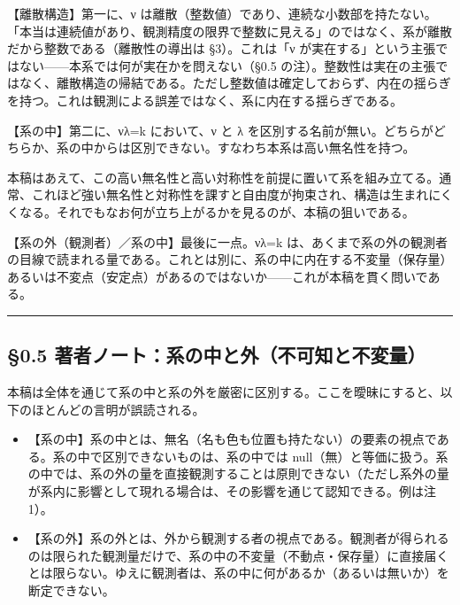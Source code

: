 \documentclass[11pt]{ltjsarticle}
\providecommand{\tightlist}{\setlength{\itemsep}{0pt}\setlength{\parskip}{0pt}}
\begin{document}
【離散構造】第一に、ν
は離散（整数値）であり、連続な小数部を持たない。「本当は連続値があり、観測精度の限界で整数に見える」のではなく、系が離散だから整数である（離散性の導出は
§3）。これは「ν
が実在する」という主張ではない------本系では何が実在かを問えない（§0.5
の注）。整数性は実在の主張ではなく、離散構造の帰結である。ただし整数値は確定しておらず、内在の揺らぎを持つ。これは観測による誤差ではなく、系に内在する揺らぎである。

【系の中】第二に、νλ=k において、ν と λ
を区別する名前が無い。どちらがどちらか、系の中からは区別できない。すなわち本系は高い無名性を持つ。

本稿はあえて、この高い無名性と高い対称性を前提に置いて系を組み立てる。通常、これほど強い無名性と対称性を課すと自由度が拘束され、構造は生まれにくくなる。それでもなお何が立ち上がるかを見るのが、本稿の狙いである。

【系の外（観測者）／系の中】最後に一点。νλ=k
は、あくまで系の外の観測者の目線で読まれる量である。これとは別に、系の中に内在する不変量（保存量）あるいは不変点（安定点）があるのではないか------これが本稿を貫く問いである。

\begin{center}\rule{0.5\linewidth}{0.5pt}\end{center}

\subsection{§0.5
著者ノート：系の中と外（不可知と不変量）}\label{ux8457ux8005ux30ceux30fcux30c8ux7cfbux306eux4e2dux3068ux5916ux4e0dux53efux77e5ux3068ux4e0dux5909ux91cf}

本稿は全体を通じて系の中と系の外を厳密に区別する。ここを曖昧にすると、以下のほとんどの言明が誤読される。

\begin{itemize}
\tightlist
\item
  【系の中】系の中とは、無名（名も色も位置も持たない）の要素の視点である。系の中で区別できないものは、系の中では
  null（無）と等価に扱う。系の中では、系の外の量を直接観測することは原則できない（ただし系外の量が系内に影響として現れる場合は、その影響を通じて認知できる。例は注1）。
\item
  【系の外】系の外とは、外から観測する者の視点である。観測者が得られるのは限られた観測量だけで、系の中の不変量（不動点・保存量）に直接届くとは限らない。ゆえに観測者は、系の中に何があるか（あるいは無いか）を断定できない。
\end{itemize}
\end{document}
